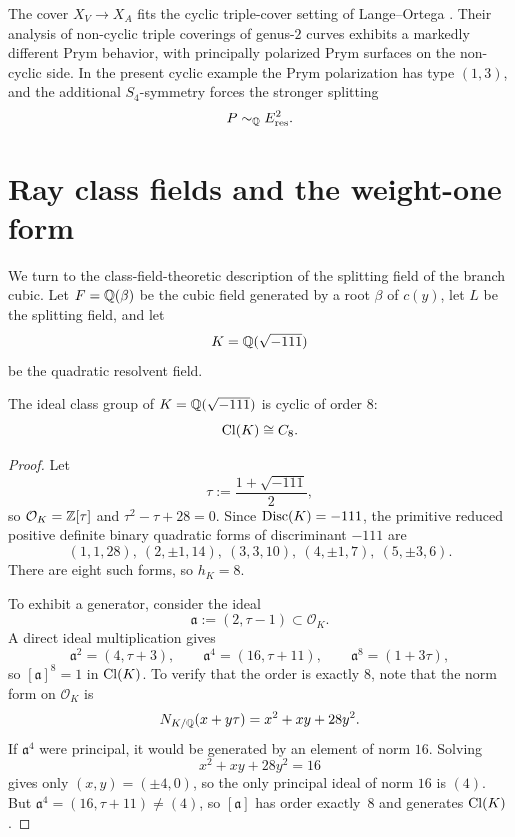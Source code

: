 \begin{remark}\label{rem:prym-triple-cover-context}
The cover \(X_V\to X_A\) fits the cyclic triple-cover setting of Lange--Ortega \cite{LangeOrtega2011}. Their analysis of non-cyclic triple coverings of genus-\(2\) curves \cite{LangeOrtegaTriple2011} exhibits a markedly different Prym behavior, with principally polarized Prym surfaces on the non-cyclic side. In the present cyclic example the Prym polarization has type \((1,3)\), and the additional \(S_4\)-symmetry forces the stronger splitting
\[
P\sim_{\mathbb{Q}}E_{\mathrm{res}}^2.
\]
\end{remark}

\section{Ray class fields and the weight-one form}

We turn to the class-field-theoretic description of the splitting field of the branch cubic. Let \(F=\mathbb{Q}(\beta)\) be the cubic field generated by a root \(\beta\) of \(c(y)\), let \(L\) be the splitting field, and let
\[
K=\mathbb{Q}(\sqrt{-111})
\]
be the quadratic resolvent field.

\begin{proposition}\label{prop:class-group}
The ideal class group of \(K=\mathbb{Q}(\sqrt{-111})\) is cyclic of order \(8\):
\[
\operatorname{Cl}(K)\cong C_8.
\]
\end{proposition}

\begin{proof}
Let
\[
\tau:=\frac{1+\sqrt{-111}}{2},
\]
so \(\mathcal O_K=\mathbb{Z}[\tau]\) and \(\tau^2-\tau+28=0\). Since \(\operatorname{Disc}(K)=-111\), the primitive reduced positive definite binary quadratic forms of discriminant \(-111\) are
\[
(1,1,28),\ (2,\pm 1,14),\ (3,3,10),\ (4,\pm 1,7),\ (5,\pm 3,6).
\]
There are eight such forms, so \(h_K=8\).

To exhibit a generator, consider the ideal
\[
\mathfrak a:=(2,\tau-1)\subset \mathcal O_K.
\]
A direct ideal multiplication gives
\[
\mathfrak a^2=(4,\tau+3),\qquad
\mathfrak a^4=(16,\tau+11),\qquad
\mathfrak a^8=(1+3\tau),
\]
so \([\mathfrak a]^8=1\) in \(\operatorname{Cl}(K)\). To verify that the order is exactly \(8\), note that the norm form on \(\mathcal O_K\) is
\[
N_{K/\mathbb{Q}}(x+y\tau)=x^2+xy+28y^2.
\]
If \(\mathfrak a^4\) were principal, it would be generated by an element of norm \(16\). Solving
\[
x^2+xy+28y^2=16
\]
gives only \((x,y)=(\pm 4,0)\), so the only principal ideal of norm \(16\) is \((4)\). But \(\mathfrak a^4=(16,\tau+11)\neq (4)\), so \([\mathfrak a]\) has order exactly~\(8\) and generates \(\operatorname{Cl}(K)\).
\end{proof}

